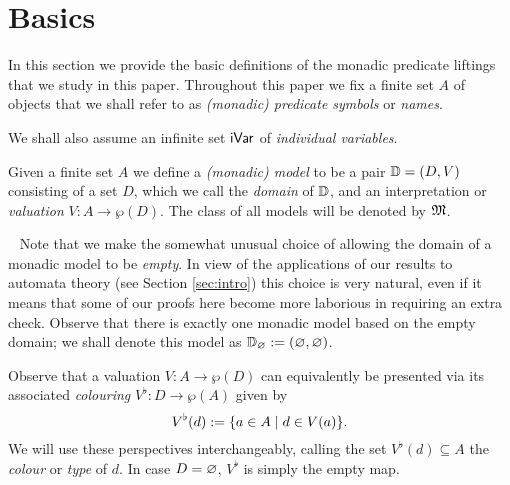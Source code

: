 
\section{Basics}

In this section we provide the basic definitions of the monadic predicate 
liftings that we study in this paper.
Throughout this paper we fix a finite set $A$ of objects that we shall refer to 
as \emph{(monadic) predicate symbols} or \emph{names}.


We shall also assume an infinite set $\mathsf{iVar}$ of \emph{individual variables}.

\begin{definition}
Given a finite set $A$ we define a \emph{(monadic) model} to be a pair
$\mathbb{D} = (D,V )$ consisting of a set $D$,  which we call the \emph{domain} of 
$\mathbb{D}$, and an interpretation or \emph{valuation} $V : A \to \wp (D)$.
The class of all models will be denoted by $\mathfrak{M}$.
\end{definition}

\begin{remark}~
Note that we make the somewhat unusual choice of allowing the domain of a
monadic model to be \emph{empty}.
In view of the applications of our results to automata theory (see 
Section \ref{sec:intro}) this choice is very natural, even if it means that 
some of our proofs here become more laborious in requiring an extra check.
Observe that there is exactly one monadic model based on the empty domain;
we shall denote this model as ${\mathbb{D}_\varnothing} \mathrel{:=} (\varnothing, \varnothing)$. 
\end{remark}

\begin{definition}
Observe that a valuation $V: A \to \wp (D)$ can equivalently be presented via 
its associated \emph{colouring} $V^{\flat}:D \to \wp(A)$ given by
\[
V^{\flat}(d) \mathrel{:=} \{a \in A \mid d \in V(a)\}.
\]
We will use these perspectives interchangeably, calling the set $V^{\flat}(d)
\subseteq A$ the \emph{colour} or \emph{type} of $d$.
In case $D = \varnothing$, $V^{\flat}$ is simply the empty map.
\end{definition}

